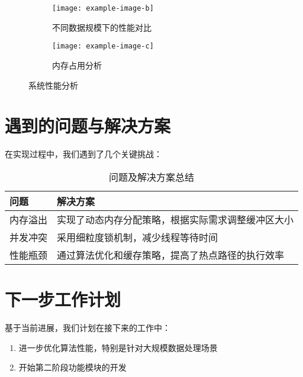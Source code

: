 \documentclass{article}
\begin{document}
\begin{figure}[h]
\centering
\begin{subfigure}{0.48\textwidth}
\centering
\texttt{[image: example-image-b]}
\caption{不同数据规模下的性能对比}
\label{fig:scale_performance}
\end{subfigure}
\hfill
\begin{subfigure}{0.48\textwidth}
\centering
\texttt{[image: example-image-c]}
\caption{内存占用分析}
\label{fig:memory_usage}
\end{subfigure}
\caption{系统性能分析}
\label{fig:performance_comparison}
\end{figure}

\section{遇到的问题与解决方案}

在实现过程中，我们遇到了几个关键挑战：

\begin{table}[h]
\centering
\caption{问题及解决方案总结}
\begin{tabular}{|p{}|p{}|}
\hline
\textbf{问题} & \textbf{解决方案} \\
\hline
内存溢出 & 实现了动态内存分配策略，根据实际需求调整缓冲区大小 \\
\hline
并发冲突 & 采用细粒度锁机制，减少线程等待时间 \\
\hline
性能瓶颈 & 通过算法优化和缓存策略，提高了热点路径的执行效率 \\
\hline
\end{tabular}
\label{tab:problems_solutions}
\end{table}

\section{下一步工作计划}

基于当前进展，我们计划在接下来的工作中：

\begin{enumerate}
\item 进一步优化算法性能，特别是针对大规模数据处理场景 \cite{ctex2020manual}
\item 开始第二阶段功能模块的开发 \cite{mittelbach2004latex}
\end{enumerate}



\end{document}
